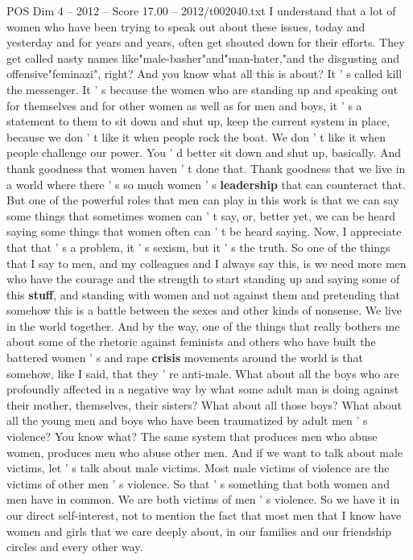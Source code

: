 \begin{textsample}{POS Dim 4 – 2012 – Score 17.00 – 2012/t002040.txt}
I understand that a lot of women who have been trying to speak out about these issues, today and yesterday and for years and years, often get shouted down for their efforts.
They get called nasty names like"male-basher"and"man-hater,"and the disgusting and offensive"feminazi", right?
And you know what all this is about?
It ' s called kill the messenger.
It ' s because the women who are standing up and speaking out for themselves and for other women as well as for men and boys, it ' s a statement to them to sit down and shut up, keep the current system in place, because we don ' t like it when people rock the boat.
We don ' t like it when people challenge our power.
You ' d better sit down and shut up, basically.
And thank goodness that women haven ' t done that.
Thank goodness that we live in a world where there ' s so much women ' s \textbf{leadership} that can counteract that.
But one of the powerful roles that men can play in this work is that we can say some things that sometimes women can ' t say, or, better yet, we can be heard saying some things that women often can ' t be heard saying.
Now, I appreciate that that ' s a problem, it ' s sexism, but it ' s the truth.
So one of the things that I say to men, and my colleagues and I always say this, is we need more men who have the courage and the strength to start standing up and saying some of this \textbf{stuff}, and standing with women and not against them and pretending that somehow this is a battle between the sexes and other kinds of nonsense.
We live in the world together.
And by the way, one of the things that really bothers me about some of the rhetoric against feminists and others who have built the battered women ' s and rape \textbf{crisis} movements around the world is that somehow, like I said, that they ' re anti-male.
What about all the boys who are profoundly affected in a negative way by what some adult man is doing against their mother, themselves, their sisters?
What about all those boys?
What about all the young men and boys who have been traumatized by adult men ' s violence?
You know what?
The same system that produces men who abuse women, produces men who abuse other men.
And if we want to talk about male victims, let ' s talk about male victims.
Most male victims of violence are the victims of other men ' s violence.
So that ' s something that both women and men have in common.
We are both victims of men ' s violence.
So we have it in our direct self-interest, not to mention the fact that most men that I know have women and girls that we care deeply about, in our families and our friendship circles and every other way.

\end{textsample}
